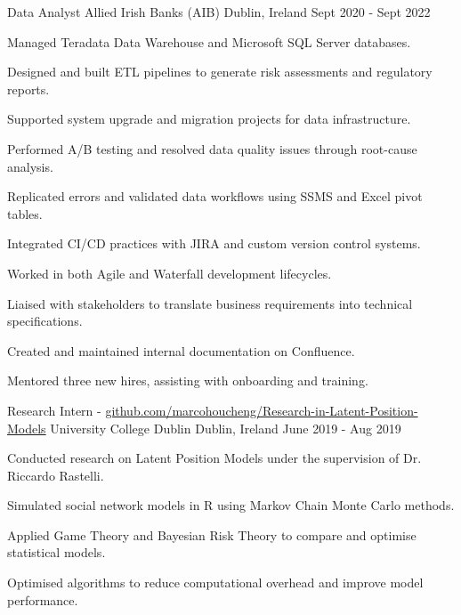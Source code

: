 \begin{cventries}
\cventry
  {Data Analyst} %
  {Allied Irish Banks (AIB)} %
  {Dublin, Ireland} %
  {Sept 2020 - Sept 2022} %
  {
    \begin{cvitems}
      \item {Managed Teradata Data Warehouse and Microsoft SQL Server databases.}
      \item {Designed and built ETL pipelines to generate risk assessments and regulatory reports.}
      \item {Supported system upgrade and migration projects for data infrastructure.}
      \item {Performed A/B testing and resolved data quality issues through root-cause analysis.}
      \item {Replicated errors and validated data workflows using SSMS and Excel pivot tables.}
      \item {Integrated CI/CD practices with JIRA and custom version control systems.}
      \item {Worked in both Agile and Waterfall development lifecycles.}
      \item {Liaised with stakeholders to translate business requirements into technical specifications.}
      \item {Created and maintained internal documentation on Confluence.}
      \item {Mentored three new hires, assisting with onboarding and training.}
    \end{cvitems}
  }

\cventry
  {Research Intern - \href{https://github.com/marcohoucheng/Research-in-Latent-Position-Models}
  {github.com/marcohoucheng/Research-in-Latent-Position-Models}} %
  {University College Dublin} %
  {Dublin, Ireland} %
  {June 2019 - Aug 2019} %
  {
    \begin{cvitems}
      \item {Conducted research on Latent Position Models under the supervision of Dr. Riccardo Rastelli.}
      \item {Simulated social network models in R using Markov Chain Monte Carlo methods.}
      \item {Applied Game Theory and Bayesian Risk Theory to compare and optimise statistical models.}
      \item {Optimised algorithms to reduce computational overhead and improve model performance.}
    \end{cvitems}
  }


\end{cventries}
